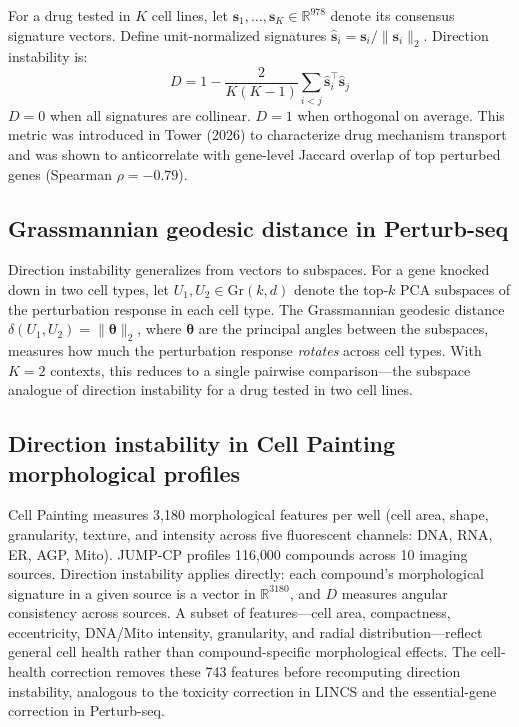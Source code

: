 \documentclass{article}
\begin{document}
For a drug tested in $K$ cell lines, let $\mathbf{s}_1, \ldots,
\mathbf{s}_K \in \mathbb{R}^{978}$ denote its consensus signature vectors.
Define unit-normalized signatures $\hat{\mathbf{s}}_i = \mathbf{s}_i /
\|\mathbf{s}_i\|_2$. Direction instability is:
\begin{equation}
  D = 1 - \frac{2}{K(K-1)} \sum_{i < j}
    \hat{\mathbf{s}}_i^\top \hat{\mathbf{s}}_j
  \label{eq:direction_instability}
\end{equation}
$D = 0$ when all signatures are collinear. $D = 1$ when orthogonal on average.
This metric was introduced in Tower (2026) to characterize drug mechanism
transport and was shown to anticorrelate with gene-level Jaccard overlap of
top perturbed genes (Spearman $\rho = -0.79$).

\subsection{Grassmannian geodesic distance in Perturb-seq}

Direction instability generalizes from vectors to subspaces. For a gene
knocked down in two cell types, let $U_1, U_2 \in \text{Gr}(k, d)$ denote
the top-$k$ PCA subspaces of the perturbation response in each cell type.
The Grassmannian geodesic distance $\delta(U_1, U_2) =
\|\boldsymbol{\theta}\|_2$, where $\boldsymbol{\theta}$ are the principal
angles between the subspaces, measures how much the perturbation response
\emph{rotates} across cell types. With $K = 2$ contexts, this reduces to a
single pairwise comparison---the subspace analogue of direction instability
for a drug tested in two cell lines.

\subsection{Direction instability in Cell Painting morphological profiles}

Cell Painting \citep{chandrasekaran2023jump} measures 3{,}180 morphological
features per well (cell area, shape, granularity, texture, and intensity
across five fluorescent channels: DNA, RNA, ER, AGP, Mito). JUMP-CP
profiles 116{,}000 compounds across 10 imaging sources. Direction
instability applies directly: each compound's morphological signature in a
given source is a vector in $\mathbb{R}^{3180}$, and $D$ measures angular
consistency across sources. A subset of features---cell area, compactness,
eccentricity, DNA/Mito intensity, granularity, and radial
distribution---reflect general cell health rather than compound-specific
morphological effects. The cell-health correction removes these 743 features
before recomputing direction instability, analogous to the toxicity
correction in LINCS and the essential-gene correction in Perturb-seq.
\end{document}
